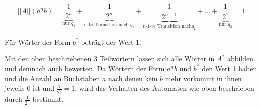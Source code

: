 \documentclass{scrartcl}
\begin{document}
\begin{equation*}
  ||A||(a^nb) = \underbrace{\frac{1}{2^n}}_{\text{nur } q_1} + \underbrace{\frac{1}{2^n}}_{\text{n-te Transition nach } q_2} + \underbrace{\frac{1}{2^{n-1}}}_{\text{n-1-te Transition nach} q_2} + \ldots + \underbrace{\frac{1}{2^1}}_{\text{nur } q_2} = 1
\end{equation*}

Für Wörter der Form $b^*$ beträgt der Wert 1.

Mit den oben beschriebenen 3 Teilwörtern lassen sich alle Wörter in $A^*$ abbilden und demnach auch bewerten. Da Wörtern der Form $a^nb$ und $b^*$ den Wert 1 haben und die Anzahl an Buchstaben $a$ nach denen kein $b$ mehr vorkommt in ihnen jeweils 0 ist und $\frac{1}{2^0} = 1$, wird das Verhalten des Automaten wie oben beschrieben durch $\frac{1}{2^n}$ bestimmt.
\end{document}
